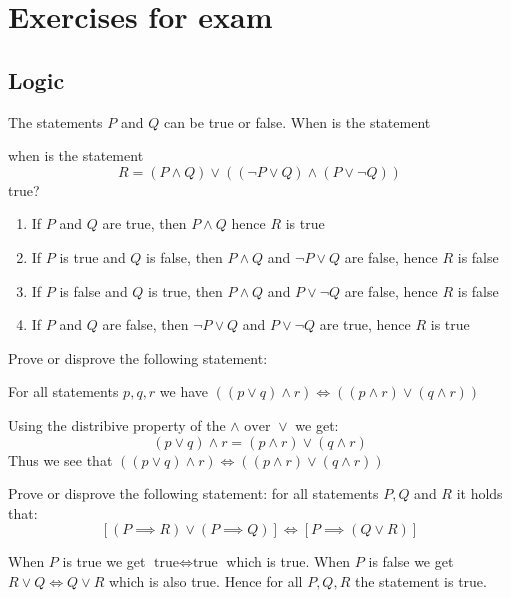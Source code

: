 \section{Exercises for exam}

\subsection{Logic}

\begin{exercise}
    The statements $P$ and $Q$ can be true or false.  When is the statement
    \par when is the statement $$ R = (P \land Q) \lor ((\lnot P \lor Q) \land (P \lor \lnot Q)) $$true?
\end{exercise}
\begin{enumerate}
    \item If $P$ and $Q$ are true, then $ P \land Q $ hence $R$ is true
    \item If $P$ is true and $Q$ is false, then $ P \land Q $ and $ \lnot P \lor Q $ are false, hence $R$ is false
    \item If $P$ is false and $Q$ is true, then $ P \land Q $ and $ P \lor \lnot Q $ are false, hence $R$ is false
    \item If $P$ and $Q$ are false, then $ \lnot P \lor Q $ and $ P \lor \lnot Q $ are true, hence $R$ is true
\end{enumerate}

\begin{exercise}
    Prove or disprove the following statement: \par
    For all statements $ p,q,r $ we have $ ((p \lor q) \land r) \iff ((p \land r) \lor (q \land r)) $
\end{exercise}
Using the distribive property of the $ \land \text{ over } \lor $ we get:
$$ (p \lor q) \land r = (p \land r) \lor (q \land r) $$
Thus we see that $ ((p \lor q) \land r) \iff ((p \land r) \lor (q \land r)) $

\begin{exercise}
    Prove or disprove the following statement:
    for all statements $P,Q$ and $R$ it holds that:
    $$ \left[(P \implies R) \lor (P \implies Q)\right] \iff \left[P \implies (Q \lor R) \right] $$
\end{exercise}
When $P$ is true we get $ \text{true} \iff \text{true} $ which is true.
When $P$ is false we get $ R \lor Q \iff Q \lor R $ which is also true.
Hence for all $P,Q,R$ the statement is true.

